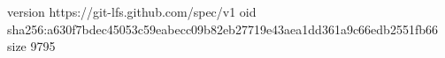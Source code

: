 version https://git-lfs.github.com/spec/v1
oid sha256:a630f7bdec45053c59eabecc09b82eb27719e43aea1dd361a9c66edb2551fb66
size 9795
